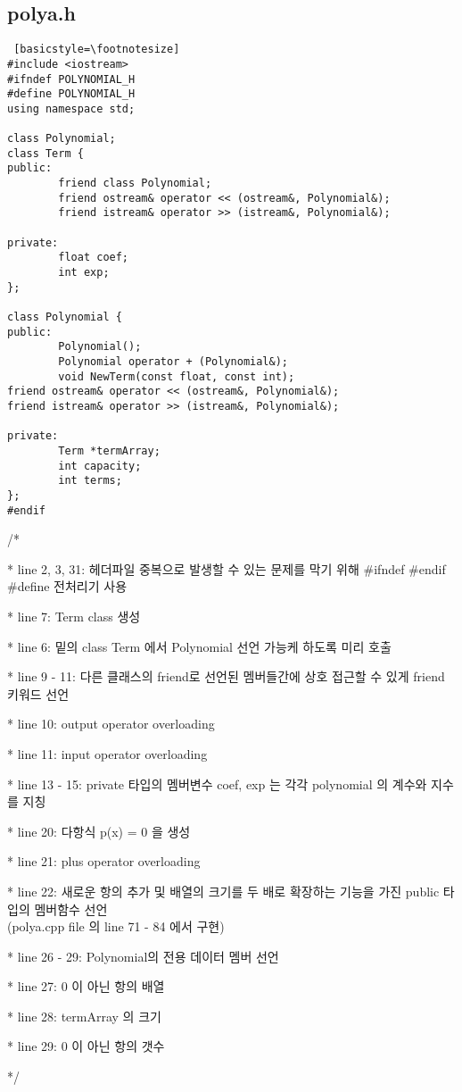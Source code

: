 \documentclass[twoside,twocolumn]{article}
\newenvironment{itemizeReduced}{
\begin{list}{\labelitemi}{\leftmargin=1em}
\setlength{\itemsep}{1pt}
\setlength{\parskip}{0pt}
\setlength{\parsep}{0pt}}{\end{list}
}
\begin{document}
\subsection{polya.h}
\begin{lstlisting} [basicstyle=\footnotesize]
#include <iostream>
#ifndef POLYNOMIAL_H
#define POLYNOMIAL_H
using namespace std;

class Polynomial;
class Term {
public:
        friend class Polynomial;
        friend ostream& operator << (ostream&, Polynomial&);
        friend istream& operator >> (istream&, Polynomial&);

private:
        float coef;
        int exp;
};

class Polynomial {
public:
        Polynomial();
        Polynomial operator + (Polynomial&);
        void NewTerm(const float, const int);
friend ostream& operator << (ostream&, Polynomial&);
friend istream& operator >> (istream&, Polynomial&);

private:
        Term *termArray;
        int capacity;
        int terms;
};
#endif
\end{lstlisting}
\begin{itemizeReduced}
    \item[/*] 
    \item[*] line 2, 3, 31: 헤더파일 중복으로 발생할 수 있는 문제를 막기 위해 \#ifndef \#endif \#define 전처리기 사용
    \item[*] line 7: Term class 생성
    \item[*] line 6: 밑의 class Term{} 에서 Polynomial 선언 가능케 하도록 미리 호출
    \item[*] line 9 - 11: 다른 클래스의 friend로 선언된 멤버들간에 상호 접근할 수 있게 friend 키워드 선언
    \item[*] line 10: output operator overloading
    \item[*] line 11: input operator overloading
    \item[*] line 13 - 15: private 타입의 멤버변수 coef, exp 는 각각 polynomial 의 계수와 지수를 지칭
    \item[*] line 20: 다항식 p(x) = 0 을 생성
    \item[*] line 21: plus operator overloading
    \item[*] line 22: 새로운 항의 추가 및 배열의 크기를 두 배로 확장하는 기능을 가진 public 타입의 멤버함수 선언 \\ (polya.cpp file 의 line 71 - 84 에서 구현)
    \item[*] line 26 - 29: Polynomial의 전용 데이터 멤버 선언
    \item[*] line 27: 0 이 아닌 항의 배열
    \item[*] line 28: termArray 의 크기
    \item[*] line 29: 0 이 아닌 항의 갯수
\end{itemizeReduced}
*/
\end{document}
